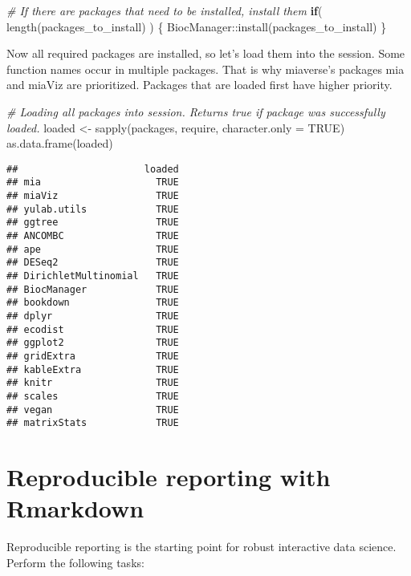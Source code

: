 \documentclass[
  oneside]{book}
\newenvironment{Shaded}{\begin{snugshade}}{\end{snugshade}}
\newcommand{\AttributeTok}[1]{\textcolor[rgb]{0.77,0.63,0.00}{#1}}
\newcommand{\CommentTok}[1]{\textcolor[rgb]{0.56,0.35,0.01}{\textit{#1}}}
\newcommand{\ConstantTok}[1]{\textcolor[rgb]{0.00,0.00,0.00}{#1}}
\newcommand{\ControlFlowTok}[1]{\textcolor[rgb]{0.13,0.29,0.53}{\textbf{#1}}}
\newcommand{\FunctionTok}[1]{\textcolor[rgb]{0.00,0.00,0.00}{#1}}
\newcommand{\NormalTok}[1]{#1}
\newcommand{\OtherTok}[1]{\textcolor[rgb]{0.56,0.35,0.01}{#1}}
\newcommand{\SpecialCharTok}[1]{\textcolor[rgb]{0.00,0.00,0.00}{#1}}
\begin{document}
\begin{Shaded}
\begin{Highlighting}[]
\CommentTok{\# If there are packages that need to be installed, install them }
\ControlFlowTok{if}\NormalTok{( }\FunctionTok{length}\NormalTok{(packages\_to\_install) ) \{}
\NormalTok{   BiocManager}\SpecialCharTok{::}\FunctionTok{install}\NormalTok{(packages\_to\_install)}
\NormalTok{\}}
\end{Highlighting}
\end{Shaded}

Now all required packages are installed, so let's load them into the session.
Some function names occur in multiple packages. That is why miaverse's packages
mia and miaViz are prioritized. Packages that are loaded first have higher priority.

\begin{Shaded}
\begin{Highlighting}[]
\CommentTok{\# Loading all packages into session. Returns true if package was successfully loaded.}
\NormalTok{loaded }\OtherTok{\textless{}{-}} \FunctionTok{sapply}\NormalTok{(packages, require, }\AttributeTok{character.only =} \ConstantTok{TRUE}\NormalTok{)}
\FunctionTok{as.data.frame}\NormalTok{(loaded)}
\end{Highlighting}
\end{Shaded}

\begin{verbatim}
##                      loaded
## mia                    TRUE
## miaViz                 TRUE
## yulab.utils            TRUE
## ggtree                 TRUE
## ANCOMBC                TRUE
## ape                    TRUE
## DESeq2                 TRUE
## DirichletMultinomial   TRUE
## BiocManager            TRUE
## bookdown               TRUE
## dplyr                  TRUE
## ecodist                TRUE
## ggplot2                TRUE
## gridExtra              TRUE
## kableExtra             TRUE
## knitr                  TRUE
## scales                 TRUE
## vegan                  TRUE
## matrixStats            TRUE
\end{verbatim}

\hypertarget{reproducible-reporting-with-rmarkdown}{%
\chapter{Reproducible reporting with Rmarkdown}\label{reproducible-reporting-with-rmarkdown}}

Reproducible reporting is the starting point for robust interactive
data science. Perform the following tasks:
\end{document}

